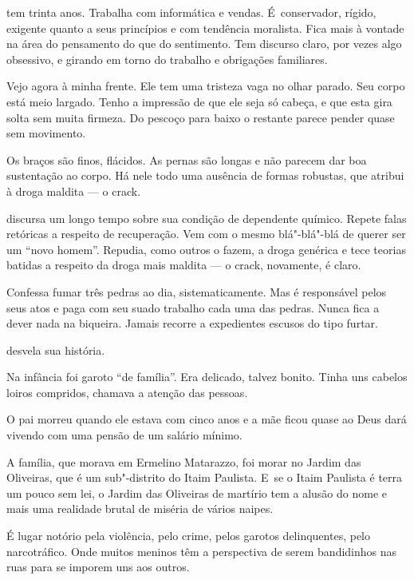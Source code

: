  

 tem trinta anos. Trabalha com informática e vendas. É~conservador,
rígido, exigente quanto a seus princípios e com tendência moralista.
Fica mais à vontade na área do pensamento do que do sentimento. Tem
discurso claro, por vezes algo obsessivo, e girando em torno do trabalho
e obrigações familiares.

Vejo agora  à minha frente. Ele tem uma tristeza vaga no olhar parado.
Seu corpo está meio largado. Tenho a impressão de que ele seja só
cabeça, e que esta gira solta sem muita firmeza. Do pescoço para baixo o
restante parece pender quase sem movimento.

Os braços são finos, flácidos. As pernas são longas e não parecem dar
boa sustentação ao corpo. Há nele todo uma ausência de formas robustas,
que  atribui à droga maldita --- o crack.

\asterisc{}

 discursa um longo tempo sobre sua condição de dependente químico.
Repete falas retóricas a respeito de recuperação. Vem com o mesmo
blá"-blá"-blá de querer ser um ``novo homem''. Repudia, como outros o
fazem, a droga genérica e tece teorias batidas a respeito da droga mais
maldita --- o crack, novamente, é claro.

Confessa fumar três pedras ao dia, sistematicamente. Mas é responsável
pelos seus atos e paga com seu suado trabalho cada uma das pedras. Nunca
fica a dever nada na biqueira. Jamais recorre a expedientes escusos do
tipo furtar.

\asterisc{}

 desvela sua história.

Na infância foi garoto ``de família''. Era delicado, talvez bonito.
Tinha uns cabelos loiros compridos, chamava a atenção das pessoas.

O pai morreu quando ele estava com cinco anos e a mãe ficou quase ao
Deus dará vivendo com uma pensão de um salário mínimo.

A família, que morava em Ermelino Matarazzo, foi morar no Jardim das
Oliveiras, que é um sub"-distrito do Itaim Paulista. E~se o Itaim
Paulista é terra um pouco sem lei, o Jardim das Oliveiras de martírio
tem a alusão do nome e mais uma realidade brutal de miséria de vários
naipes.

É lugar notório pela violência, pelo crime, pelos garotos delinquentes,
pelo narcotráfico. Onde muitos meninos têm a perspectiva de serem
bandidinhos nas ruas para se imporem uns aos outros.

